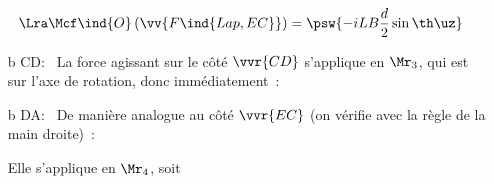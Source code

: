 \documentclass[../../main/main.tex]{subfiles}
\begin{document}
\begin{tcb*}[breakable]
\begin{itemize}
\begin{isd}[interior hidden, sidebyside align=top, lefthand ratio=.3]
\begin{align*}
{				}%
				\\\Lra
				\Mcf\ind{O} \left( \vv{F\ind{Lap,EC}} \right)
				 & = \psw{-iLB \frac{d}{2}\sin{\th}\uz}
			\end{align*}
		\end{isd}
		\item[b]{CD}:~
		La force agissant sur le côté $\vvr{CD}$ s'applique en $\Mr_3$, qui est sur
		l'axe de rotation, donc immédiatement~:
		\psw{%
			\[
				\boxed{\Mcf\ind{O} \left( \vv{F\ind{Lap,CD}} \right) = \of}
			\]
		}%
		\item[b]{DA}:~
		De manière analogue au côté $\vvr{EC}$ (on vérifie avec la règle de la
		main droite)~:
		\smallbreak
		\vspace{-15pt}
		\begin{isd}[interior hidden, sidebyside align=top]
			\psw{%
				\[
					\vv{F\ind{Lap,DA}} = iLB\uy
				\]
			}%
			\tcblower
			Elle s'applique en $\Mr_4$, soit
		\end{isd}
	\end{itemize}
	\vspace{-30pt}

\end{tcb*}
\end{document}
